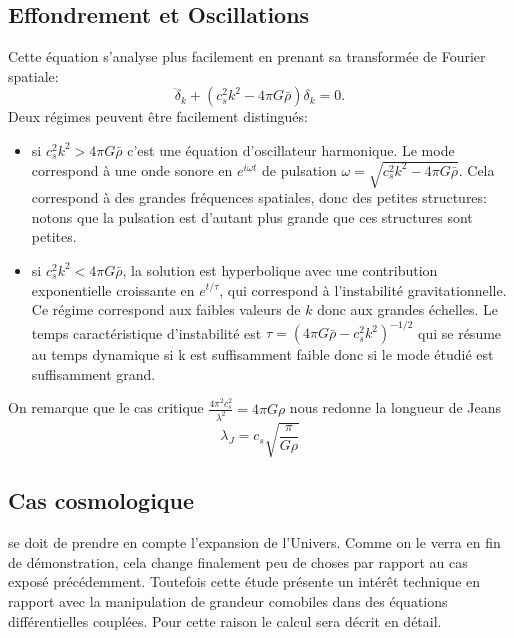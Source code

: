  \subsection{Effondrement et Oscillations}
 Cette équation s'analyse plus facilement en prenant sa transformée de Fourier spatiale:
 \begin{equation}
 \ddot \delta_k +(c_s^2k ^2-4\pi G \bar \rho) \delta_k= 0.
 \end{equation}
 Deux régimes peuvent être facilement distingués:
 \begin{itemize}
 \item si $c_s^2 k^2> 4\pi G \bar \rho$ c'est une équation d'oscillateur harmonique. Le mode correspond à une onde sonore en $e^{i\omega t}$ de pulsation $\omega=\sqrt{c_s^2 k^2-4\pi G \bar \rho}$. Cela correspond à des grandes fréquences spatiales, donc des petites structures: notons que la pulsation est d'autant plus grande que ces structures sont petites.
 \item si $c_s^2 k^2< 4\pi G \bar \rho$, la solution est hyperbolique avec une contribution exponentielle croissante en $e^{t/\tau}$, qui correspond à l'instabilité gravitationnelle. Ce régime correspond aux faibles valeurs de $k$ donc aux grandes échelles. Le temps caractéristique d'instabilité est $\tau = (4\pi G \bar \rho - c_s^2k^2)^{-1/2}$ qui se résume au temps dynamique si k est suffisamment faible donc si le mode étudié est suffisamment grand. 
 \end{itemize}
 
 On remarque que le cas critique $\frac{4\pi^2c_s^2}{\lambda^2}=4\pi G \rho$ nous redonne la longueur de Jeans
 \begin{equation}
 \lambda_J=c_s\sqrt{\frac{\pi}{G\rho}}
 \end{equation}
 
 \subsection{Cas cosmologique}
 se doit de prendre en compte l'expansion de l'Univers. Comme on le verra en fin de démonstration, cela change finalement peu de choses par rapport au cas exposé précédemment. Toutefois cette étude présente un intérêt technique en rapport avec la manipulation de grandeur comobiles dans des équations différentielles couplées. Pour cette raison le calcul sera décrit en détail.

